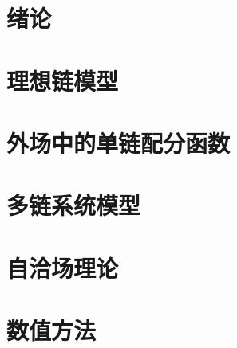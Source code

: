 

\chapter{绪论}
%

\chapter{理想链模型}
%

\chapter{外场中的单链配分函数}
%

\chapter{多链系统模型}
%

\chapter{自洽场理论}
%

\chapter{数值方法}

